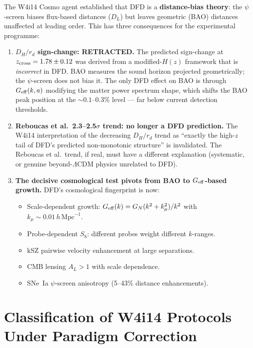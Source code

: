 \documentclass[11pt]{article}
\newcommand{\LCDM}{\Lambda\text{CDM}}
\newcommand{\Geff}{G_{\rm eff}}
\begin{document}
The W4i14 Cosmo agent established that DFD is a \textbf{distance-bias
theory}: the $\psi$-screen biases flux-based distances ($D_L$) but leaves
geometric (BAO) distances unaffected at leading order. This has three
consequences for the experimental programme:

\begin{enumerate}
\item \textbf{$D_H/r_d$ sign-change: RETRACTED.}
The predicted sign-change at $z_{\rm cross} = 1.78 \pm 0.12$ was derived
from a modified-$H(z)$ framework that is \emph{incorrect} in DFD.
BAO measures the sound horizon projected geometrically; the $\psi$-screen
does not bias it. The only DFD effect on BAO is through $\Geff(k,a)$
modifying the matter power spectrum shape, which shifts the BAO peak
position at the $\sim 0.1$--$0.3\%$ level --- far below current
detection thresholds.

\item \textbf{Reboucas et al.\ 2.3--2.5$\sigma$ trend: no longer
a DFD prediction.}
The W4i14 interpretation of the decreasing $D_H/r_d$ trend as ``exactly
the high-$z$ tail of DFD's predicted non-monotonic structure'' is
invalidated. The Reboucas et al.\ trend, if real, must have a different
explanation (systematic, or genuine beyond-$\LCDM$ physics unrelated to
DFD).

\item \textbf{The decisive cosmological test pivots from BAO to
$\Geff$-based growth.}
DFD's cosmological fingerprint is now:
\begin{itemize}[nosep]
\item Scale-dependent growth: $\Geff(k) = G_N(k^2 + k_\mu^2)/k^2$ with
  $k_\mu \sim 0.01\,h\,\text{Mpc}^{-1}$.
\item Probe-dependent $S_8$: different probes weight different $k$-ranges.
\item kSZ pairwise velocity enhancement at large separations.
\item CMB lensing $A_L > 1$ with scale dependence.
\item SNe~Ia $\psi$-screen anisotropy (5--43\% distance enhancements).
\end{itemize}
\end{enumerate}

\section{Classification of W4i14 Protocols Under Paradigm Correction}
\end{document}
